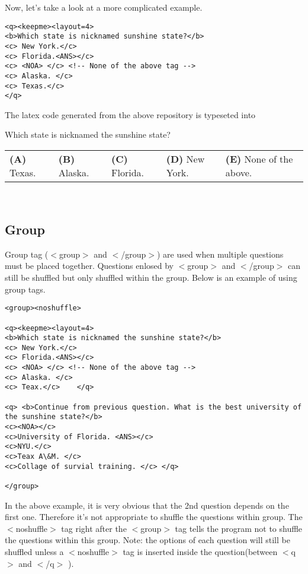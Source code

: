 \documentclass[11pt,letterpaper]{article}
\begin{document}
Now, let's take a look at a more complicated example. 
\begin{verbatim}
<q><keepme><layout=4>
<b>Which state is nicknamed sunshine state?</b>
<c> New York.</c>
<c> Florida.<ANS></c>
<c> <NOA> </c> <!-- None of the above tag -->
<c> Alaska. </c>
<c> Texas.</c>
</q>
\end{verbatim}

The latex code generated from the above repository is typeseted into 
\begin{enumerate}
\setlength{\itemsep}{0pt}
\setlength{\parskip}{0pt}
\setlength{\parsep}{0pt}
\item Which state is nicknamed the sunshine state?\\
    \begin{tabular}{l l l l l}
        \textsf{\textbf{(A)} Texas.}&
        \textsf{\textbf{(B)} Alaska.}&
        \textsf{\textbf{(C)} Florida.}&
        \textsf{\textbf{(D)} New York.}&
        \textsf{\textbf{(E)} None of the above. }\\
    \end{tabular}\\
\end{enumerate}

\subsection{Group}
Group tag ($<$group$>$ and $<$/group$>$) are used when multiple questions must be placed together. Questions enlosed by $<$group$>$ and $<$/group$>$ can still be shuffled but only shuffled within the group. Below is an example of using group tags. 

\begin{verbatim}
<group><noshuffle>

<q><keepme><layout=4>
<b>Which state is nicknamed the sunshine state?</b>
<c> New York.</c>
<c> Florida.<ANS></c>
<c> <NOA> </c> <!-- None of the above tag -->
<c> Alaska. </c>
<c> Teax.</c>    </q>

<q> <b>Continue from previous question. What is the best university of the sunshine state?</b>
<c><NOA></c>
<c>University of Florida. <ANS></c>
<c>NYU.</c>
<c>Teax A\&M. </c>
<c>Collage of survial training. </c> </q>

</group>
\end{verbatim}
In the above example, it is very obvious that the 2nd question depends on the first one. Therefore it's not appropriate to shuffle the questions within group. The $<$noshuffle$>$ tag right after the $<$group$>$ tag tells the program not to shuffle the questions within this group. Note: the options of each question will still be shuffled unless a $<$noshuffle$>$ tag is inserted inside the question(between $<$q$>$ and $<$/q$>$  ). 
\end{document}
